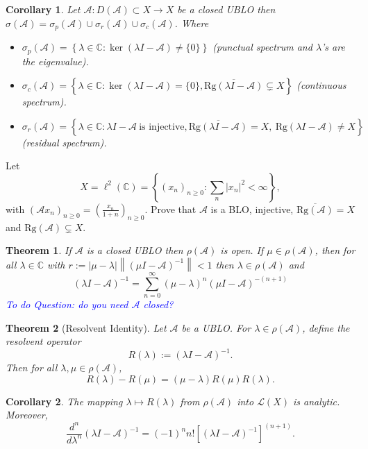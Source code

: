 \documentclass[12pt, oneside]{book}
\newtheorem{coro}{Corollary}[section]
\newtheorem{theo}{Theorem}[section]
\newcommand{\norm}[1]{\left\lVert#1\right\rVert}
\newcommand{\A}{\mathscr{A}}
\renewcommand{\L}{\mathcal{L}}
\begin{document}
	\begin{coro}
		Let $\mathscr{A}:D(\mathscr{A})\subset X\longrightarrow X$ be a closed UBLO then $\sigma(\mathscr{A})=\sigma_p(\mathscr{A})\cup \sigma_r(\mathscr{A})\cup\sigma_c(\mathscr{A})$. Where
		\begin{itemize}
			\item $\sigma_p(\mathscr{A})=\left\{\lambda\in\mathbb{C}:\ker(\lambda I-\mathscr{A})\neq \{0\}\right\}$ (punctual spectrum and $\lambda$'s are the eigenvalue).
			\item $\sigma_c(\mathscr{A})=\left\{\lambda\in\mathbb{C}:\ker(\lambda I-\mathscr{A})= \{0\},\overline{\text{Rg}(\lambda I-\mathscr{A})}\subsetneq X\right\}$ (continuous spectrum).
			\item $\sigma_r(\mathscr{A})=\left\{\lambda\in\mathbb{C}:\lambda I-\mathscr{A} \ \text{is injective},\overline{\text{Rg}(\lambda I-\mathscr{A})}= X, \ \text{Rg}(\lambda I-\mathscr{A})\neq X\right\}$ (residual spectrum).
		\end{itemize}
	\end{coro}
\begin{exercise}{}{}
	Let $$X=\ell^2(\mathbb{C})=\left\{(x_n)_{n\geq 0}:\sum_n |x_n|^2<\infty\right\},$$
with $(\mathscr{A}x_n)_{n\geq 0}=\left(\frac{x_n}{1+n}\right)_{n\geq 0}$. Prove that $\mathscr{A}$ is a BLO, injective, $\overline{\text{Rg}(\mathscr{A})}=X$ and $\text{Rg}(\mathscr{A})\subsetneq X$.
\end{exercise}	
	\begin{theo}
		If $\mathscr{A}$ is a closed UBLO then $\rho(\mathscr{A})$ is open. If $\mu\in \rho(\mathscr{A})$, then for all $\lambda\in \mathbb{C}$ with $r:=\left|\mu-\lambda\right| \norm{(\mu I-\mathscr{A})^{-1}} < 1$ then $\lambda\in \rho(\mathscr{A})$ and
	\vspace{-2mm}
	$$(\lambda I-\mathscr{A})^{-1}=\sum_{n=0}^{\infty}(\mu-\lambda)^n(\mu I-\mathscr{A})^{-(n+1)}$$
	\textcolor{blue}{To do Question: do you need $\mathscr{A}$ closed?}
	\end{theo}	
\begin{theo}[Resolvent Identity]
	Let $\A$ be a UBLO.
	For $\lambda \in \rho(\A)$, define the resolvent operator
	\vspace{-2mm}
	\[
	R(\lambda) := (\lambda I - \A)^{-1}.
	\]
	Then for all $\lambda, \mu \in \rho(\A)$,
	\[
	R(\lambda) - R(\mu) = (\mu - \lambda) R(\mu) R(\lambda).
	\]
\end{theo}	
\begin{coro}
	The mapping
	$
	\lambda \mapsto R(\lambda)
	$
	from $\rho(\A)$ into $\L(X)$ is analytic. Moreover,
	\[
	\frac{d^n}{d\lambda^n} (\lambda I - \A)^{-1}
	= (-1)^n n! [(\lambda I - \A)^{-1}]^{(n+1)}.
	\]
\end{coro}
\end{document}

